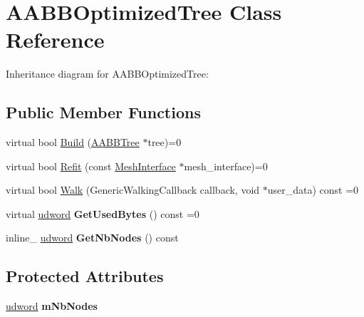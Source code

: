 \hypertarget{class_a_a_b_b_optimized_tree}{\section{A\+A\+B\+B\+Optimized\+Tree Class Reference}
\label{class_a_a_b_b_optimized_tree}
}


Inheritance diagram for A\+A\+B\+B\+Optimized\+Tree\+:
\subsection*{Public Member Functions}
\begin{DoxyCompactItemize}
\item 
virtual bool \hyperlink{class_a_a_b_b_optimized_tree_acbe22cc880be2a05232bd84efb029e37}{Build} (\hyperlink{class_a_a_b_b_tree}{A\+A\+B\+B\+Tree} $\ast$tree)=0
\item 
virtual bool \hyperlink{class_a_a_b_b_optimized_tree_a306eaa4c045e8549937df133dfe94e12}{Refit} (const \hyperlink{class_mesh_interface}{Mesh\+Interface} $\ast$mesh\+\_\+interface)=0
\item 
virtual bool \hyperlink{class_a_a_b_b_optimized_tree_addc2788f0391992e359ee76cf87923de}{Walk} (Generic\+Walking\+Callback callback, void $\ast$user\+\_\+data) const =0
\item 
\hypertarget{class_a_a_b_b_optimized_tree_a167d786413b470a0a5970c95a78feaf5}{virtual \hyperlink{_ice_types_8h_a44c6f1920ba5551225fb534f9d1a1733}{udword} {\bfseries Get\+Used\+Bytes} () const =0}\label{class_a_a_b_b_optimized_tree_a167d786413b470a0a5970c95a78feaf5}

\item 
\hypertarget{class_a_a_b_b_optimized_tree_a0b37c6e0b222dd0f2b776b81cdc43c93}{inline\+\_\+ \hyperlink{_ice_types_8h_a44c6f1920ba5551225fb534f9d1a1733}{udword} {\bfseries Get\+Nb\+Nodes} () const }\label{class_a_a_b_b_optimized_tree_a0b37c6e0b222dd0f2b776b81cdc43c93}

\end{DoxyCompactItemize}
\subsection*{Protected Attributes}
\begin{DoxyCompactItemize}
\item 
\hypertarget{class_a_a_b_b_optimized_tree_a808983c59c9aa9fb9efefec356bdf13d}{\hyperlink{_ice_types_8h_a44c6f1920ba5551225fb534f9d1a1733}{udword} {\bfseries m\+Nb\+Nodes}}\label{class_a_a_b_b_optimized_tree_a808983c59c9aa9fb9efefec356bdf13d}

\end{DoxyCompactItemize}


